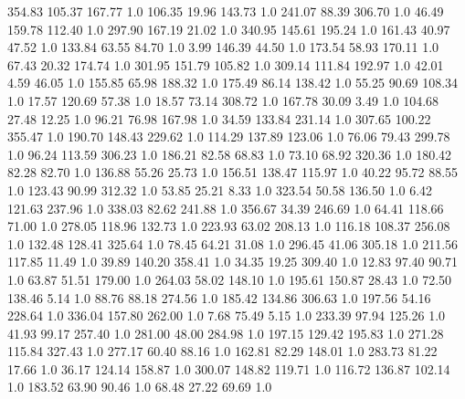     354.83    105.37    167.77  1.0
    106.35     19.96    143.73  1.0
    241.07     88.39    306.70  1.0
     46.49    159.78    112.40  1.0
    297.90    167.19     21.02  1.0
    340.95    145.61    195.24  1.0
    161.43     40.97     47.52  1.0
    133.84     63.55     84.70  1.0
      3.99    146.39     44.50  1.0
    173.54     58.93    170.11  1.0
     67.43     20.32    174.74  1.0
    301.95    151.79    105.82  1.0
    309.14    111.84    192.97  1.0
     42.01      4.59     46.05  1.0
    155.85     65.98    188.32  1.0
    175.49     86.14    138.42  1.0
     55.25     90.69    108.34  1.0
     17.57    120.69     57.38  1.0
     18.57     73.14    308.72  1.0
    167.78     30.09      3.49  1.0
    104.68     27.48     12.25  1.0
     96.21     76.98    167.98  1.0
     34.59    133.84    231.14  1.0
    307.65    100.22    355.47  1.0
    190.70    148.43    229.62  1.0
    114.29    137.89    123.06  1.0
     76.06     79.43    299.78  1.0
     96.24    113.59    306.23  1.0
    186.21     82.58     68.83  1.0
     73.10     68.92    320.36  1.0
    180.42     82.28     82.70  1.0
    136.88     55.26     25.73  1.0
    156.51    138.47    115.97  1.0
     40.22     95.72     88.55  1.0
    123.43     90.99    312.32  1.0
     53.85     25.21      8.33  1.0
    323.54     50.58    136.50  1.0
      6.42    121.63    237.96  1.0
    338.03     82.62    241.88  1.0
    356.67     34.39    246.69  1.0
     64.41    118.66     71.00  1.0
    278.05    118.96    132.73  1.0
    223.93     63.02    208.13  1.0
    116.18    108.37    256.08  1.0
    132.48    128.41    325.64  1.0
     78.45     64.21     31.08  1.0
    296.45     41.06    305.18  1.0
    211.56    117.85     11.49  1.0
     39.89    140.20    358.41  1.0
     34.35     19.25    309.40  1.0
     12.83     97.40     90.71  1.0
     63.87     51.51    179.00  1.0
    264.03     58.02    148.10  1.0
    195.61    150.87     28.43  1.0
     72.50    138.46      5.14  1.0
     88.76     88.18    274.56  1.0
    185.42    134.86    306.63  1.0
    197.56     54.16    228.64  1.0
    336.04    157.80    262.00  1.0
      7.68     75.49      5.15  1.0
    233.39     97.94    125.26  1.0
     41.93     99.17    257.40  1.0
    281.00     48.00    284.98  1.0
    197.15    129.42    195.83  1.0
    271.28    115.84    327.43  1.0
    277.17     60.40     88.16  1.0
    162.81     82.29    148.01  1.0
    283.73     81.22     17.66  1.0
     36.17    124.14    158.87  1.0
    300.07    148.82    119.71  1.0
    116.72    136.87    102.14  1.0
    183.52     63.90     90.46  1.0
     68.48     27.22     69.69  1.0

